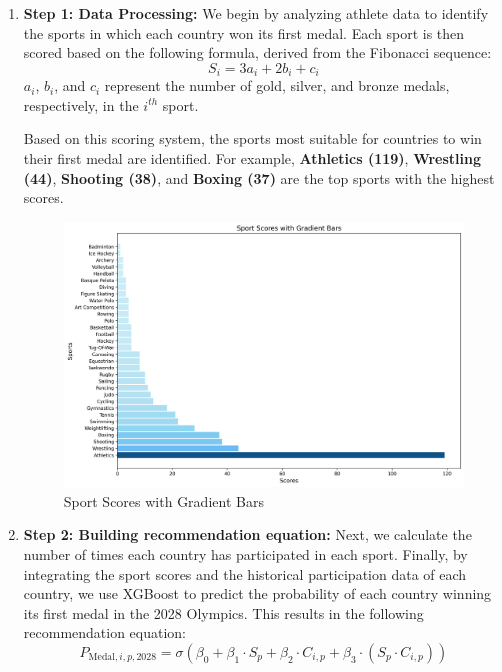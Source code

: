 \documentclass[12pt]{article}  %
\begin{document}
\begin{enumerate}[\textbullet]
    \item \textbf{Step 1: Data Processing: }
    We begin by analyzing athlete data to identify the sports in which each country won its first medal. Each sport is then scored based on the following formula, derived from the Fibonacci sequence: 
    \begin{equation}
        S_i = 3a_i +2b_i +c_i\tag{29}
    \end{equation}
    $a_i$, $b_i$, and $c_i$ represent the number of gold, silver, and bronze medals, respectively, in the $i^{th}$ sport.
    
    Based on this scoring system, the sports most suitable for countries to win their first medal are identified. For example,\textbf{ Athletics (119)}, \textbf{Wrestling (44)}, \textbf{Shooting (38)}, and \textbf{Boxing (37)} are the top sports with the highest scores.

    \begin{figure}[h]
        \centering
        \includegraphics[width=0.75\linewidth]{Sport-Score2.png}
        \caption{Sport Scores with Gradient Bars}
        \label{fig:enter-label}
    \end{figure}

    \item \textbf{Step 2: Building recommendation equation: }Next, we calculate the number of times each country has participated in each sport. Finally, by integrating the sport scores and the historical participation data of each country, we use XGBoost to predict the probability of each country winning its first medal in the 2028 Olympics. This results in the following recommendation equation:
    \begin{equation}
        P_{\text{Medal},i,p,2028} = \sigma \left( \beta_0 + \beta_1 \cdot S_p + \beta_2 \cdot C_{i,p} + \beta_3 \cdot (S_p \cdot C_{i,p}) \right)\tag{30}
    \end{equation}


\end{enumerate}
\end{document}
